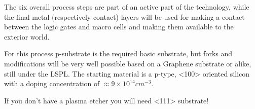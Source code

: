 The six overall process steps are part of an active part of the technology, while the final metal (respectively contact) layers will be used for making a contact between the logic gates and macro cells and making them available to the exterior world.

For this process p-substrate is the required basic substrate, but forks and modifications will be very well possible based on a Graphene substrate or alike, still under the LSPL.
The starting material is a p-type, <100> oriented silicon with a doping concentration of $\approx 9\times10^{14}cm^{-3}$.\\

\begin{mdframed}[linewidth=2pt,linecolor=red]
	If you don't have a plasma etcher you will need <111> substrate!
\end{mdframed}
